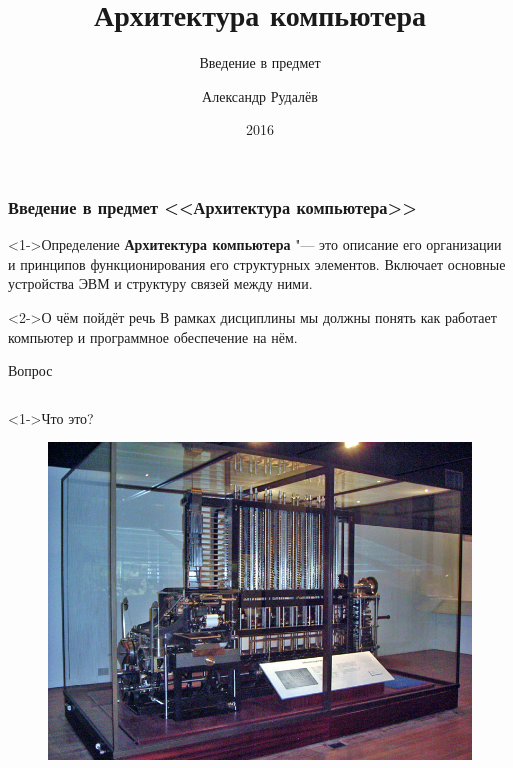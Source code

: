 \documentclass[pdf,9pt,aspectratio=169]{beamer}
\title[]{Архитектура компьютера}
\subtitle{Введение в предмет}
\author[]{Александр Рудалёв}
\institute[]{ИМИКТ САФУ}
\date[]{2016}
\begin{document}
\frame{\titlepage}

\begin{frame}\frametitle{Введение в предмет <<Архитектура компьютера>>}
  \begin{block}<1->{Определение}
    \textbf{Архитектура компьютера} "---  это описание его организации и принципов функционирования его структурных элементов. Включает основные устройства ЭВМ и структуру связей между ними.
  \end{block}
  \begin{block}<2->{О чём пойдёт речь}
    В рамках дисциплины мы должны понять как работает компьютер и программное обеспечение на нём.
  \end{block}
\end{frame}

\begin{frame}{Вопрос}
  \begin{columns}[c]
    \begin{column}[]{0.5\textwidth}  
      \begin{alertblock}<1->{Что это?}
        \begin{figure}
          \includegraphics[width=\textwidth]{images/DifferenceEngine.jpg}
        \end{figure}
      \end{alertblock}
    \end{column}
  \end{columns}
\end{frame}
\end{document}
